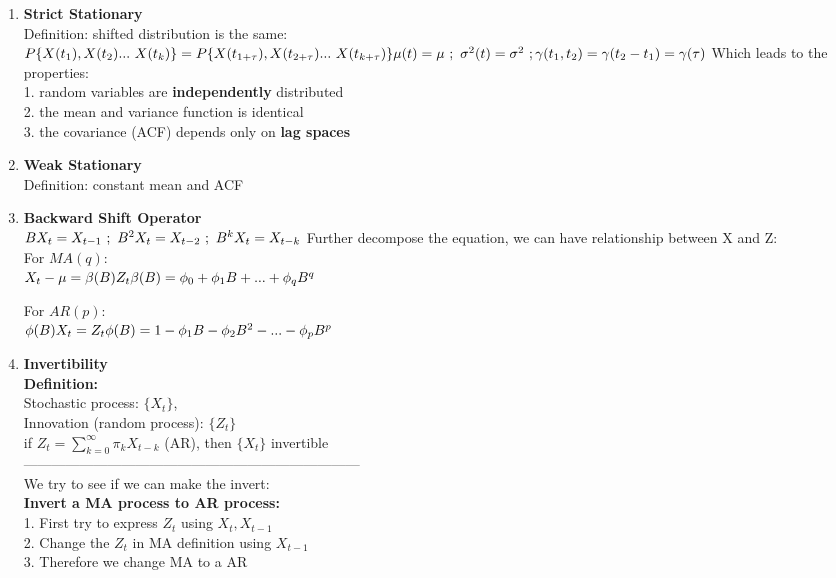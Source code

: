 \documentclass[10pt,landscape]{article}
\begin{document}
\begin{multicols}{3}
\begin{enumerate}
  		
  \item \textbf{Strict Stationary}\\
		Definition: shifted distribution is the same:\\
		$
		P\{X(t_1), X(t_2) ...\ X(t_k)\} = P\{X(t_{1+\tau}), X(t_{2+\tau}) ...\ X(t_{k+\tau})\}\newline
		\mu(t) = \mu \ ; \ \sigma^2(t) = \sigma^2 \ ; \gamma(t_1,t_2) = \gamma(t_2-t_1) = \gamma(\tau)
		$
		Which leads to the properties:\\
		1. random variables are \textbf{independently} distributed\\
		2. the mean and variance function is identical\\
		3. the covariance (ACF) depends only on \textbf{lag spaces}
  \item \textbf{Weak Stationary}\\
  		Definition: constant mean and ACF
  \item \textbf{Backward Shift Operator}\\
  		$
  		BX_t = X_{t-1} \ ; \ B^2X_t = X_{t-2} \ ; \ B^kX_t = X_{t-k}\\
  		$
  		Further decompose the equation, we can have relationship between X and Z:\\
  		For $MA(q)$:\\
  		$
  		X_t - \mu = \beta(B)Z_t\\
  		\beta(B) = \phi_0 + \phi_1B+ ... + \phi_qB^q
  		$
  		
  		For $AR(p)$:\\
  		$
  		\phi(B)X_t = Z_t\\
  		\phi(B) = 1-\phi_1B - \phi_2B^2 - ... - \phi_pB^p
  		$
  		
  \item \textbf{Invertibility}\\
  		\textbf{Definition:}\\
  		Stochastic process: $\{X_t\}$, \\
  		Innovation (random process): $\{Z_t\}$\\
  		if $Z_t = \sum_{k=0}^{\infty} \pi_kX_{t-k}$ (AR), then $\{X_t\}$ invertible\\
  		------------------------------------------------------------------------\\
  		We try to see if we can make the invert:\\
  		\textbf{Invert a MA process to AR process:}\\
  		1. First try to express $Z_t$ using $X_t, X_{t-1}$\\
  		2. Change the $Z_t$ in MA definition using $X_{t-1}$\\
  		3. Therefore we change MA to a AR
  		

\end{enumerate}
\end{multicols}
\end{document}
